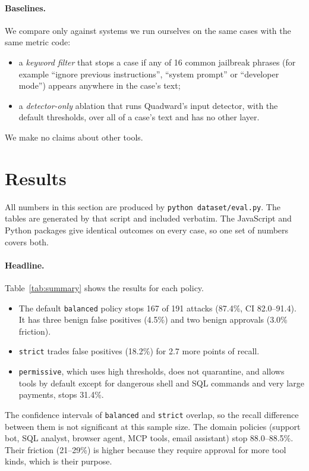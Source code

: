 \documentclass[10pt]{article}
\begin{document}
\paragraph{Baselines.} We compare only against systems we run ourselves on the same cases with the same metric code:
\begin{itemize}
\item a \emph{keyword filter} that stops a case if any of 16 common jailbreak phrases (for example ``ignore previous instructions'', ``system prompt'' or ``developer mode'') appears anywhere in the case's text;
\item a \emph{detector-only} ablation that runs Quadward's input detector, with the default thresholds, over all of a case's text and has no other layer.
\end{itemize}
We make no claims about other tools.

\section{Results}
\label{sec:results}
All numbers in this section are produced by \texttt{python dataset/eval.py}. The tables are generated by that script and included verbatim. The JavaScript and Python packages give identical outcomes on every case, so one set of numbers covers both.

\begin{table}[htbp]
\centering\small

\caption{Headline results on all 257 cases. ``Stopped'' is recall over the 191 attacks. FP is the share of the 66 benign cases that were blocked, quarantined or redacted (approvals excluded). Precision and F1 are overall and count benign approvals as false positives. The eight Quadward rows are the bundled policies. The last two rows are our baselines.}
\label{tab:summary}
\end{table}

\paragraph{Headline.} Table~\ref{tab:summary} shows the results for each policy.
\begin{itemize}
\item The default \texttt{balanced} policy stops 167 of 191 attacks (87.4\%, CI 82.0--91.4). It has three benign false positives (4.5\%) and two benign approvals (3.0\% friction).
\item \texttt{strict} trades false positives (18.2\%) for 2.7 more points of recall.
\item \texttt{permissive}, which uses high thresholds, does not quarantine, and allows tools by default except for dangerous shell and SQL commands and very large payments, stops 31.4\%.
\end{itemize}
The confidence intervals of \texttt{balanced} and \texttt{strict} overlap, so the recall difference between them is not significant at this sample size. The domain policies (support bot, SQL analyst, browser agent, MCP tools, email assistant) stop 88.0--88.5\%. Their friction (21--29\%) is higher because they require approval for more tool kinds, which is their purpose.
\end{document}
